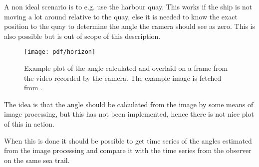 A non ideal scenario is to e.g. use the harbour quay. This works if
the ship is not moving a lot around relative to the quay, else it is
needed to know the exact position to the quay to determine the angle the
camera should see as zero. This is also possible but is out of scope
of this description.

\begin{figure}[htbp]
\centering
\texttt{[image: pdf/horizon]}
\caption{Example plot of the angle calculated and overlaid on a frame
from the video recorded by the camera. The example image is fetched
from \citep{horizon-img}.}
\end{figure}

The idea is that the angle should be calculated from the image by some
means of image processing, but this has not been implemented, hence
there is not nice plot of this in action. 

When this is done it should be possible to get time series of the
angles estimated from the image processing and compare it with the
time series from the observer on the same sea trail.
